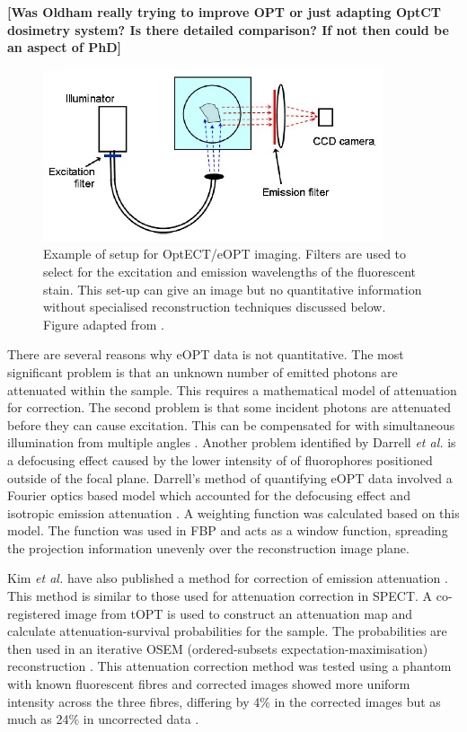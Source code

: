 \documentclass[12pt]{article}
\begin{document}
\textbf{[Was Oldham really trying to improve OPT or just adapting OptCT dosimetry system? Is there detailed comparison? If not then could be an aspect of PhD]
}

\begin{figure}[H]
\centering
\includegraphics[scale=1]{Oldham_2007ku_eCTsetup.jpg}
\caption{Example of setup for OptECT/eOPT imaging. Filters are used to select for the excitation and emission wavelengths of the fluorescent stain. This set-up can give an image but no quantitative information without specialised reconstruction techniques discussed below. Figure adapted from \cite{Oldham:2007ku}.}
\label{fig:eOPTsetup}
\end{figure}







There are several reasons why eOPT data is not quantitative. The most significant problem is that an unknown number of emitted photons are attenuated within the sample. This requires a mathematical model of attenuation for correction. The second problem is that some incident photons are attenuated before they can cause excitation.  This can be compensated for with simultaneous illumination from multiple angles \cite{Kim:2008eua}.  Another problem identified by Darrell \textit{et al.} is a defocusing effect caused by the lower intensity of of fluorophores positioned outside of the focal plane. Darrell's method of quantifying eOPT data involved a Fourier optics based model which accounted for the defocusing effect and isotropic emission attenuation \cite{Darrell:2008gd}. A weighting function was calculated based on this model. The function was used in FBP and acts as a window function, spreading the projection information unevenly over the reconstruction image plane.

Kim \textit{et al.} have also published a method for correction of emission attenuation \cite{Kim:2008eua}. This method is similar to those used for attenuation correction in SPECT. A co-registered image from tOPT is used to construct an attenuation map and calculate attenuation-survival probabilities for the sample. The probabilities are then used in an iterative OSEM (ordered-subsets expectation-maximisation) reconstruction \cite{Kim:2008eua, hudson1994accelerated}. This attenuation correction method was tested using a  phantom with known fluorescent fibres and corrected images showed more uniform intensity across the three fibres, differing by 4\% in the corrected images but as much as 24\% in uncorrected data \cite{Kim:2008eua}.
\end{document}
